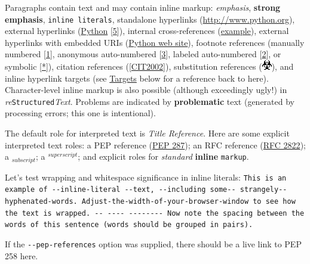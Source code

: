 \documentclass[10pt,a4paper,english]{article}
\newcommand{\titlereference}[1]{\textsl{#1}}
\begin{document}
Paragraphs contain text and may contain inline markup: \emph{emphasis},
\textbf{strong emphasis}, \texttt{inline literals}, standalone hyperlinks
(\href{http://www.python.org}{http://www.python.org}), external hyperlinks (\href{http://www.python.org/}{Python} [\hyperlink{id21}{5}]), internal
cross-references (\href{\#example}{example}), external hyperlinks with embedded URIs
(\href{http://www.python.org}{Python web site}), footnote references
(manually numbered [\hyperlink{id6}{1}], anonymous auto-numbered [\hyperlink{id9}{3}], labeled
auto-numbered [\hyperlink{label}{2}], or symbolic [\hyperlink{id10}{*}]), citation references
([\hyperlink{cit2002}{CIT2002}]), substitution references (\includegraphics{../../../docs/user/rst/images/biohazard.png}), and \hypertarget{inline-hyperlink-targets}{inline
hyperlink targets} (see \href{\#targets}{Targets} below for a reference back to here).
Character-level inline markup is also possible (although exceedingly
ugly!) in \emph{re}\texttt{Structured}\emph{Text}.  Problems are indicated by
{\color{red}\bfseries{}{\textbar}problematic{\textbar}} text (generated by processing errors; this one is
intentional).

The default role for interpreted text is \titlereference{Title Reference}.  Here are
some explicit interpreted text roles: a PEP reference (\href{http://www.python.org/peps/pep-0287.html}{PEP 287}); an
RFC reference (\href{http://www.faqs.org/rfcs/rfc2822.html}{RFC 2822}); a $_{subscript}$; a $^{superscript}$;
and explicit roles for \emph{standard} \textbf{inline}
\texttt{markup}.

Let's test wrapping and whitespace significance in inline literals:
\texttt{This is an example of -{}-inline-literal -{}-text, -{}-including some-{}-
strangely-{}-hyphenated-words.  Adjust-the-width-of-your-browser-window
to see how the text is wrapped.  -{}- -{}-{}-{}- -{}-{}-{}-{}-{}-{}-{}-  Now note    the
spacing    between the    words of    this sentence    (words
should    be grouped    in pairs).}

If the \texttt{-{}-pep-references} option was supplied, there should be a
live link to PEP 258 here.



\hypertarget{bullet-lists}{}
\end{document}
